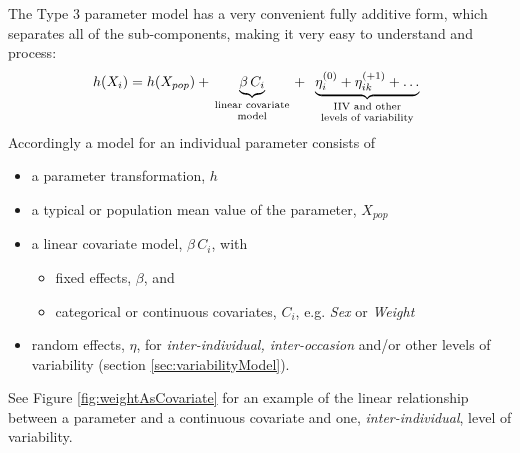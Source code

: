 The Type 3 parameter model has a very convenient fully additive form, which separates all of the sub-components, making it very easy to understand and process:
\begin{align*}
h(X_i) = h(X_{pop})
+ \underbrace{\beta \,C_i}_{\text{\parbox{2cm}{\centering linear covariate\\[-4pt] model}}}
+ \underbrace{\eta_i^{(0)}+ \eta_{ik}^{(+1)} + \dots}_{\text{\parbox{3cm}{\centering IIV and other\\[-4pt] levels of variability}}}
\end{align*}
Accordingly a model for an individual parameter consists of
\begin{itemize}
\item
a parameter transformation, $h$
\item
a typical or population mean value of the parameter, $X_{pop}$
\item
a linear covariate model, $\beta \, C_i$, with
\begin{itemize}
\item
fixed effects, $\beta$, and
\item
categorical or continuous covariates, $C_i$, e.g. \textit{Sex} or \textit{Weight}
\end{itemize}
\item
random effects, $\eta$, for \textit{inter-individual, inter-occasion} and/or other levels of variability (section \ref{sec:variabilityModel}).
\end{itemize}
See Figure \ref{fig:weightAsCovariate} for an example of the linear relationship between a parameter and a continuous covariate and one, \textit{inter-individual}, level of variability.

